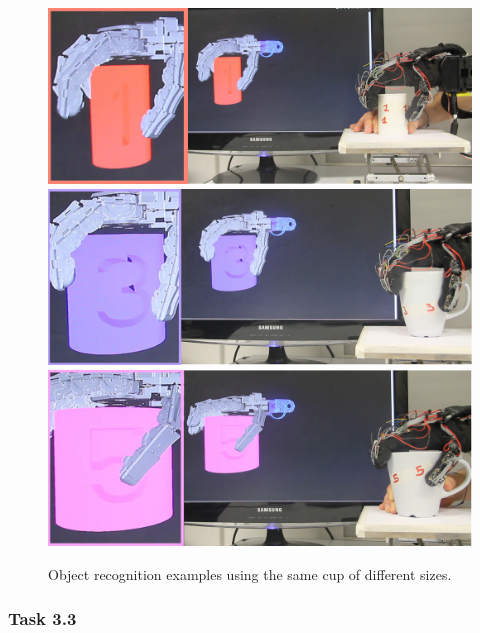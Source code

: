 \documentclass[a4paper,11pt,pdf]{pacmanreport}
\begin{document}
\begin{figure}
\centering
\includegraphics[width=0.8\linewidth]{Object_1.png}
\includegraphics[width=0.8\linewidth]{Object_3.png}
\includegraphics[width=0.8\linewidth]{Object_5.png}
\caption{Object recognition examples using the same cup of different sizes.}
\label{fig:Object_1}
\end{figure}




\subsubsection{Task 3.3}
\end{document}
